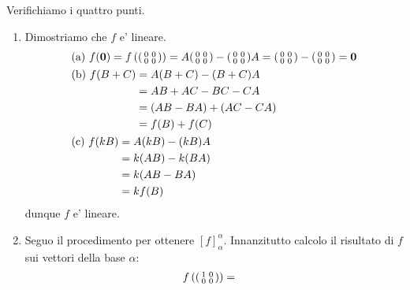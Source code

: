 \begin{solution}
    Verifichiamo i quattro punti.
    \begin{enumerate}
        \item Dimostriamo che $f$ e' lineare.
            \begin{alignat*}{2}
                &\text{(a) } f(\vec{0}) = f\left(\begin{psmallmatrix}0&0\\0&0\end{psmallmatrix}\right) = A\begin{psmallmatrix}0&0\\0&0\end{psmallmatrix} - \begin{psmallmatrix}0&0\\0&0\end{psmallmatrix}A = \begin{psmallmatrix}0&0\\0&0\end{psmallmatrix} - \begin{psmallmatrix}0&0\\0&0\end{psmallmatrix} = \vec 0 \\
                &\begin{alignedat}{1}
                    \text{(b) } f(B + C) &= A(B + C) - (B + C)A \\
                    &= AB + AC - BC - CA \\
                    &= (AB - BA) + (AC - CA) \\
                    &= f(B) + f(C)
                \end{alignedat}\\
                &\begin{alignedat}{1}
                    \text{(c) } f(kB) &= A(kB) - (kB)A \\
                    &= k(AB) - k(BA) \\
                    &= k(AB - BA) \\
                    &= kf(B)
                \end{alignedat}
            \end{alignat*}
            dunque $f$ e' lineare.
        \item Seguo il procedimento per ottenere $[f]^{\alpha}_{\alpha}$. Innanzitutto calcolo il risultato di $f$ sui vettori della base $\alpha$:
        \begin{alignat*}{1}
            &f\left(\begin{psmallmatrix}1&0\\0&0\end{psmallmatrix}\right) = 

\end{alignat*}
\end{enumerate}
\end{solution}
